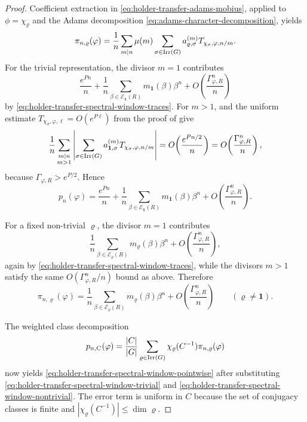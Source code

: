 \begin{proof}
  Coefficient extraction in
  \eqref{eq:holder-transfer-adams-mobius}, applied to
  \(\phi=\chi_\varrho\) and the Adams decomposition
  \eqref{eq:adams-character-decomposition}, yields
  \[
    \pi_{n,\varrho}(\varphi)
    =
    \frac{1}{n}\sum_{m\mid n}\mu(m)
      \sum_{\sigma\in\operatorname{Irr}(G)}
        a_{\varrho,\sigma}^{(m)}T_{\chi_\sigma,\varphi,n/m}.
  \]
  For the trivial representation, the divisor \(m=1\) contributes
  \[
    \frac{e^{Pn}}{n}
    +\frac{1}{n}
      \sum_{\beta\in\mathcal E_{\mathbf 1}(R)}
        m_{\mathbf 1}(\beta)\beta^n
    +O\!\left(\frac{\Gamma_{\varphi,R}^n}{n}\right)
  \]
  by \eqref{eq:holder-transfer-spectral-window-traces}. For \(m>1\),
   and the uniform estimate
  \(T_{\chi_\sigma,\varphi,\ell}=O(e^{P\ell})\) from the proof of
   give
  \[
    \frac{1}{n}
    \sum_{\substack{m\mid n\\ m>1}}
      \left|
        \sum_{\sigma\in\operatorname{Irr}(G)}
          a_{\mathbf 1,\sigma}^{(m)}
          T_{\chi_\sigma,\varphi,n/m}
      \right|
    =
    O\!\left(\frac{e^{Pn/2}}{n}\right)
    =
    O\!\left(\frac{\Gamma_{\varphi,R}^n}{n}\right),
  \]
  because \(\Gamma_{\varphi,R}>e^{P/2}\). Hence
  \begin{equation}\label{eq:holder-transfer-spectral-window-trivial}
    p_n(\varphi)
    =
    \frac{e^{Pn}}{n}
    +\frac{1}{n}
      \sum_{\beta\in\mathcal E_{\mathbf 1}(R)}
        m_{\mathbf 1}(\beta)\beta^n
    +O\!\left(\frac{\Gamma_{\varphi,R}^n}{n}\right).
  \end{equation}

  For a fixed non-trivial \(\varrho\), the divisor \(m=1\) contributes
  \[
    \frac{1}{n}
      \sum_{\beta\in\mathcal E_\varrho(R)}
        m_\varrho(\beta)\beta^n
    +O\!\left(\frac{\Gamma_{\varphi,R}^n}{n}\right),
  \]
  again by \eqref{eq:holder-transfer-spectral-window-traces}, while the
  divisors \(m>1\) satisfy the same
  \(O(\Gamma_{\varphi,R}^n/n)\) bound as above. Therefore
  \begin{equation}\label{eq:holder-transfer-spectral-window-nontrivial}
    \pi_{n,\varrho}(\varphi)
    =
    \frac{1}{n}
      \sum_{\beta\in\mathcal E_\varrho(R)}
        m_\varrho(\beta)\beta^n
    +O\!\left(\frac{\Gamma_{\varphi,R}^n}{n}\right)
    \qquad (\varrho\neq\mathbf 1).
  \end{equation}

  The weighted class decomposition
  \[
    p_{n,C}(\varphi)
    =
    \frac{|C|}{|G|}
      \sum_{\varrho\in\operatorname{Irr}(G)}
        \chi_\varrho(C^{-1})\pi_{n,\varrho}(\varphi)
  \]
  now yields \eqref{eq:holder-transfer-spectral-window-pointwise} after
  substituting
  \eqref{eq:holder-transfer-spectral-window-trivial} and
  \eqref{eq:holder-transfer-spectral-window-nontrivial}. The error term
  is uniform in \(C\) because the set of conjugacy classes is finite and
  \(|\chi_\varrho(C^{-1})|\le \dim\varrho\).


\end{proof}
